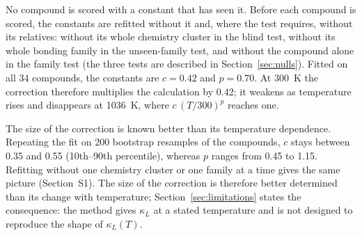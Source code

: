 No compound is scored with a constant that has seen it. Before each compound is scored, the
constants are refitted without it and, where the test requires, without its relatives: without its
whole chemistry cluster in the blind test, without its whole bonding family in the
unseen-family test, and without the compound alone in the family test (the three
tests are described in Section~\ref{sec:nulls}). Fitted on all \num{34} compounds, the constants are $c=\num{0.42}$ and
$p=\num{0.70}$. At \SI{300}{\kelvin} the correction therefore multiplies the calculation by
\num{0.42}; it weakens as temperature rises and disappears at \SI{1036}{\kelvin}, where
$c\,(T/300)^{p}$ reaches one.

The size of the correction is known better than its temperature dependence. Repeating the fit on
\num{200} bootstrap resamples of the compounds, $c$ stays between \num{0.35} and \num{0.55}
(10th--90th percentile), whereas $p$ ranges from \num{0.45} to \num{1.15}. Refitting without one
chemistry cluster or one family at a time gives the same picture (Section~S1). The size of the correction is therefore better determined than its change with temperature;
Section~\ref{sec:limitations} states the consequence: the method gives $\kappa_L$ at a stated
temperature and is not designed to reproduce the shape of $\kappa_L(T)$.

